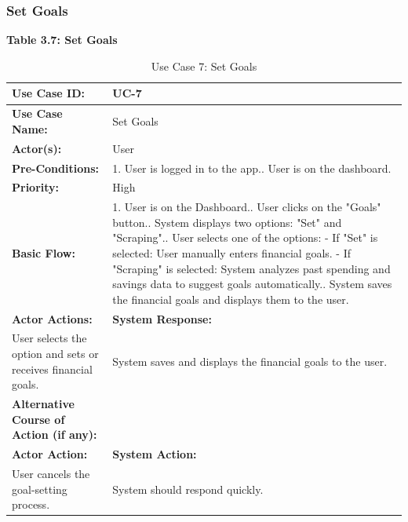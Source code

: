 \documentclass[12pt]{article}
\begin{document}
\subsubsection{Set Goals}
\vspace{0.5 cm}
    \begin{center}
        \textbf{Table 3.7: Set Goals}
    \end{center}
\begin{table}[H] %
    \centering
    \begin{tabular}{|p{4cm}|p{10cm}|}
        \hline
        \textbf{Use Case ID:} & UC-7 \\ \hline
        \textbf{Use Case Name:} & Set Goals \\ \hline
        \textbf{Actor(s):} & User \\ \hline
        \textbf{Pre-Conditions:} & 
        1. User is logged in to the app.\newline
2. User is on the dashboard. \\ \hline
        \textbf{Priority:} & High \\ \hline
        \textbf{Basic Flow:} & 1. User is on the Dashboard.\newline
2. User clicks on the "Goals" button.\newline
3. System displays two options: "Set" and "Scraping".\newline
4. User selects one of the options:\newline
- If "Set" is selected: User manually enters financial goals.\newline
- If "Scraping" is selected: System analyzes past spending and savings data to suggest goals automatically.\newline
5. System saves the financial goals and displays them to the user.\\ \hline
        \textbf{Actor Actions:} & \textbf{System Response:} \\ \hline
        User selects the option and sets or receives financial goals.& System saves and displays the financial goals to the user. \\ \hline
        \textbf{Alternative Course of Action (if any):} &  \\ \hline
        \textbf{Actor Action:} & \textbf{System Action:} \\ \hline
      User cancels the goal-setting process. & System should respond quickly.\\ \hline
     \end{tabular} 
     \caption{Use Case 7: Set Goals}
\end{table}
\end{document}
